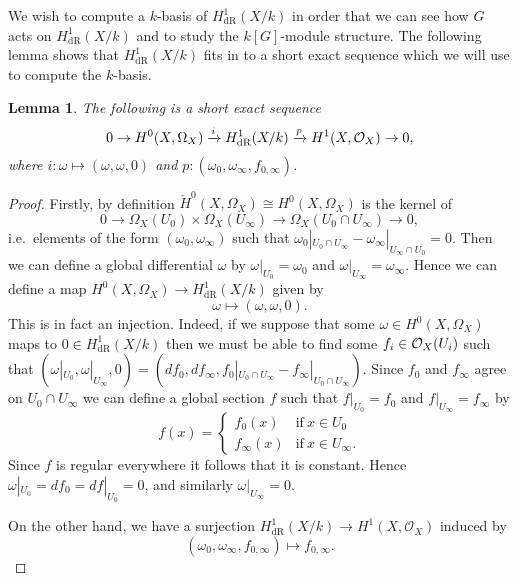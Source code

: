 \documentclass[draft, 11pt]{article} %
\theoremstyle{plain}
\newtheorem{lem}[defn]{Lemma}
\theoremstyle{remark}
\newcommand{\cO}{{\cal O}}
\newcommand{\ra}{\rightarrow}
\newcommand{\hzero}{{H^0(X,\Omega_X)}}
\newcommand{\hone}{H^1(X,\mathcal{O}_X)}
\newcommand{\derhamhone}{H_{\text {dR}}^1(X/k)}
\newcommand{\cechhzero}{{\check{H}^0(X,\Omega_X)}}
\begin{document}
We wish to compute a $k$-basis of $\derhamhone$ in order that we can see how $G$ acts on $\derhamhone$ and to study the $k[G]$-module structure.
The following lemma shows that $\derhamhone$ fits in to a short exact sequence which we will use to compute the $k$-basis.
\begin{lem}
The following is a short exact sequence
\begin{equation}\label{ses}
0 \ra H^0(X,\Omega_X) \xrightarrow{i} \derhamhone \xrightarrow{p} H^1(X,\cO_X) \ra 0,
\end{equation}
where $i\colon \omega \mapsto (\omega,\omega,0)$ and $p \colon (\omega_0, \omega_\infty, f_{0,\infty} )$.
\end{lem}
\begin{proof}
Firstly, by definition $\cechhzero \cong \hzero$ is the kernel of
\[
0 \ra \Omega_X(U_0) \times \Omega_X(U_\infty) \ra \Omega_X(U_0 \cap U_\infty ) \ra 0,
\]
i.e.\ elements of the form $(\omega_0, \omega_\infty)$ such that $\omega_0|_{U_0 \cap U_\infty} - \omega_\infty|_{U_\infty \cap U_0} = 0$.
Then we can define a global differential $\omega$ by $\omega|_{U_0} = \omega_0$ and $\omega|_{U_\infty} = \omega_\infty$.
Hence we can define a map $\hzero \ra \derhamhone$ given by
\[
\omega \mapsto (\omega, \omega, 0).
\]
This is in fact an injection.
Indeed, if we suppose that some $\omega\in \hzero$ maps to $0 \in \derhamhone$ then we must be able to find some $f_i\in \cO_X(U_i)$ such that $(\omega|_{U_0}, \omega|_{U_\infty}, 0) = (df_0, df_\infty, f_0|_{U_0\cap U_\infty} - f_\infty|_{U_0\cap U_\infty})$.
Since $f_0$ and $f_\infty$ agree on $U_0 \cap U_\infty$ we can define a global section $f$ such that $f|_{U_0} = f_0$ and $f|_{U_\infty} = f_ \infty$ by 
\begin{equation}
f(x) = \begin{cases}
f_0(x) & \text{if}\ x \in U_0 \\
f_\infty(x) & \text{if}\ x \in U_\infty.
\end{cases}
\end{equation}
Since $f$ is regular everywhere it follows that it is constant.
Hence $\omega|_{U_0} = df_0 = df|_{U_0} = 0$, and similarly $\omega|_{U_\infty} = 0$.

On the other hand, we have a surjection $\derhamhone \ra \hone$ induced by
\[
(\omega_0, \omega_\infty, f_{0, \infty}) \mapsto f_{0, \infty}.
\]


\end{proof}
\end{document}
